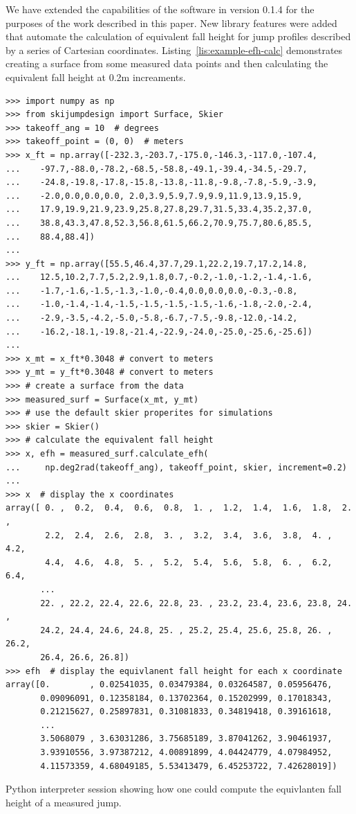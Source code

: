 \documentclass{article}
\begin{document}
We have extended the capabilities of the software in version 0.1.4 for the
purposes of the work described in this paper. New library features were added
that automate the calculation of equivalent fall height for jump profiles
described by a series of Cartesian coordinates.
Listing~\ref{lis:example-efh-calc} demonstrates creating a surface from some
measured data points and then calculating the equivalent fall height at
0.2\si{\meter} increaments.
%
\begin{listing*}
  \begin{verbatim}
>>> import numpy as np
>>> from skijumpdesign import Surface, Skier
>>> takeoff_ang = 10  # degrees
>>> takeoff_point = (0, 0)  # meters
>>> x_ft = np.array([-232.3,-203.7,-175.0,-146.3,-117.0,-107.4,
...    -97.7,-88.0,-78.2,-68.5,-58.8,-49.1,-39.4,-34.5,-29.7,
...    -24.8,-19.8,-17.8,-15.8,-13.8,-11.8,-9.8,-7.8,-5.9,-3.9,
...    -2.0,0.0,0.0,0.0, 2.0,3.9,5.9,7.9,9.9,11.9,13.9,15.9,
...    17.9,19.9,21.9,23.9,25.8,27.8,29.7,31.5,33.4,35.2,37.0,
...    38.8,43.3,47.8,52.3,56.8,61.5,66.2,70.9,75.7,80.6,85.5,
...    88.4,88.4])
...
>>> y_ft = np.array([55.5,46.4,37.7,29.1,22.2,19.7,17.2,14.8,
...    12.5,10.2,7.7,5.2,2.9,1.8,0.7,-0.2,-1.0,-1.2,-1.4,-1.6,
...    -1.7,-1.6,-1.5,-1.3,-1.0,-0.4,0.0,0.0,0.0,-0.3,-0.8,
...    -1.0,-1.4,-1.4,-1.5,-1.5,-1.5,-1.5,-1.6,-1.8,-2.0,-2.4,
...    -2.9,-3.5,-4.2,-5.0,-5.8,-6.7,-7.5,-9.8,-12.0,-14.2,
...    -16.2,-18.1,-19.8,-21.4,-22.9,-24.0,-25.0,-25.6,-25.6])
...
>>> x_mt = x_ft*0.3048 # convert to meters
>>> y_mt = y_ft*0.3048 # convert to meters
>>> # create a surface from the data
>>> measured_surf = Surface(x_mt, y_mt)
>>> # use the default skier properites for simulations
>>> skier = Skier()
>>> # calculate the equivalent fall height
>>> x, efh = measured_surf.calculate_efh(
...     np.deg2rad(takeoff_ang), takeoff_point, skier, increment=0.2)
...
>>> x  # display the x coordinates
array([ 0. ,  0.2,  0.4,  0.6,  0.8,  1. ,  1.2,  1.4,  1.6,  1.8,  2. ,
        2.2,  2.4,  2.6,  2.8,  3. ,  3.2,  3.4,  3.6,  3.8,  4. ,  4.2,
        4.4,  4.6,  4.8,  5. ,  5.2,  5.4,  5.6,  5.8,  6. ,  6.2,  6.4,
       ...
       22. , 22.2, 22.4, 22.6, 22.8, 23. , 23.2, 23.4, 23.6, 23.8, 24. ,
       24.2, 24.4, 24.6, 24.8, 25. , 25.2, 25.4, 25.6, 25.8, 26. , 26.2,
       26.4, 26.6, 26.8])
>>> efh  # display the equivlanent fall height for each x coordinate
array([0.        , 0.02541035, 0.03479384, 0.03264587, 0.05956476,
       0.09096091, 0.12358184, 0.13702364, 0.15202999, 0.17018343,
       0.21215627, 0.25897831, 0.31081833, 0.34819418, 0.39161618,
       ...
       3.5068079 , 3.63031286, 3.75685189, 3.87041262, 3.90461937,
       3.93910556, 3.97387212, 4.00891899, 4.04424779, 4.07984952,
       4.11573359, 4.68049185, 5.53413479, 6.45253722, 7.42628019])
  \end{verbatim}
  \caption{Python interpreter session showing how one could compute the
  equivlanten fall height of a measured jump.}
  \label{lis:example-efh-calc}
\end{listing*}
\end{document}
